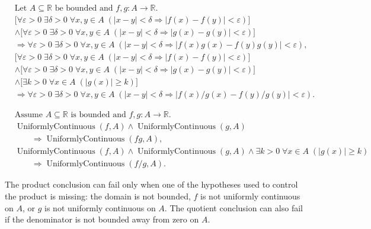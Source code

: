 \begin{remark*}
\[
\begin{aligned}
&\text{Let } A \subseteq \mathbb{R} \text{ be bounded and } f,g:A \to \mathbb{R}.\\
&\bigl[\forall \varepsilon > 0\; \exists \delta > 0\; \forall x,y \in A\;(|x-y|<\delta \Rightarrow |f(x)-f(y)|<\varepsilon)\bigr]\\
&\land \bigl[\forall \varepsilon > 0\; \exists \delta > 0\; \forall x,y \in A\;(|x-y|<\delta \Rightarrow |g(x)-g(y)|<\varepsilon)\bigr]\\
&\Rightarrow \forall \varepsilon > 0\; \exists \delta > 0\; \forall x,y \in A\;(|x-y|<\delta \Rightarrow |f(x)g(x)-f(y)g(y)|<\varepsilon),\\
&\bigl[\forall \varepsilon > 0\; \exists \delta > 0\; \forall x,y \in A\;(|x-y|<\delta \Rightarrow |f(x)-f(y)|<\varepsilon)\bigr]\\
&\land \bigl[\forall \varepsilon > 0\; \exists \delta > 0\; \forall x,y \in A\;(|x-y|<\delta \Rightarrow |g(x)-g(y)|<\varepsilon)\bigr]\\
&\land \bigl[\exists k>0\; \forall x \in A\;(|g(x)| \ge k)\bigr]\\
&\Rightarrow \forall \varepsilon > 0\; \exists \delta > 0\; \forall x,y \in A\;(|x-y|<\delta \Rightarrow |f(x)/g(x)-f(y)/g(y)|<\varepsilon).
\end{aligned}
\]
\end{remark*}

\begin{remark*}
\[
\begin{aligned}
&\text{Assume } A \subseteq \mathbb{R} \text{ is bounded and } f,g:A \to \mathbb{R}.\\
&\operatorname{UniformlyContinuous}(f,A) \land \operatorname{UniformlyContinuous}(g,A)\\
&\qquad\Longrightarrow \operatorname{UniformlyContinuous}(fg,A),\\
&\operatorname{UniformlyContinuous}(f,A) \land \operatorname{UniformlyContinuous}(g,A) \land \exists k>0\;\forall x \in A\;(|g(x)| \ge k)\\
&\qquad\Longrightarrow \operatorname{UniformlyContinuous}(f/g,A).
\end{aligned}
\]
\end{remark*}

\begin{remark*}
The product conclusion can fail only when one of the hypotheses used to
control the product is missing: the domain is not bounded, $f$ is not
uniformly continuous on $A$, or $g$ is not uniformly continuous on $A$.
The quotient conclusion can also fail if the denominator is not bounded
away from zero on $A$.
\end{remark*}

